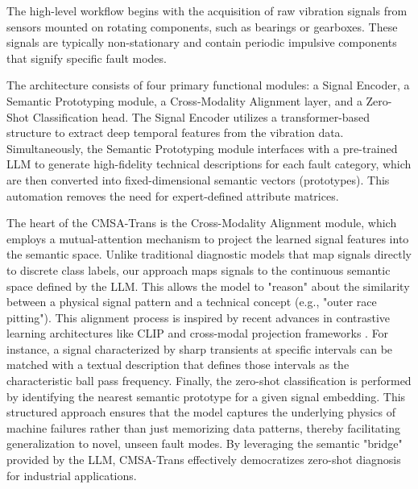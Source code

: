 \documentclass[journal]{IEEEtran}
\begin{document}
The high-level workflow begins with the acquisition of raw vibration signals from sensors mounted on rotating components, such as bearings or gearboxes. These signals are typically non-stationary and contain periodic impulsive components that signify specific fault modes.

The architecture consists of four primary functional modules: a Signal Encoder, a Semantic Prototyping module, a Cross-Modality Alignment layer, and a Zero-Shot Classification head. The Signal Encoder utilizes a transformer-based structure \cite{vaswani2017attention, zerveas2021transformer} to extract deep temporal features from the vibration data. Simultaneously, the Semantic Prototyping module interfaces with a pre-trained LLM \cite{radford2021learning} to generate high-fidelity technical descriptions for each fault category, which are then converted into fixed-dimensional semantic vectors (prototypes). This automation removes the need for expert-defined attribute matrices.

The heart of the CMSA-Trans is the Cross-Modality Alignment module, which employs a mutual-attention mechanism to project the learned signal features into the semantic space. Unlike traditional diagnostic models that map signals directly to discrete class labels, our approach maps signals to the continuous semantic space defined by the LLM. This allows the model to "reason" about the similarity between a physical signal pattern and a technical concept (e.g., "outer race pitting"). This alignment process is inspired by recent advances in contrastive learning architectures like CLIP \cite{radford2021learning} and cross-modal projection frameworks \cite{oord2018representation, chen2020simple}. For instance, a signal characterized by sharp transients at specific intervals can be matched with a textual description that defines those intervals as the characteristic ball pass frequency. Finally, the zero-shot classification is performed by identifying the nearest semantic prototype for a given signal embedding. This structured approach ensures that the model captures the underlying physics of machine failures rather than just memorizing data patterns, thereby facilitating generalization to novel, unseen fault modes. By leveraging the semantic "bridge" provided by the LLM, CMSA-Trans effectively democratizes zero-shot diagnosis for industrial applications.
\end{document}
